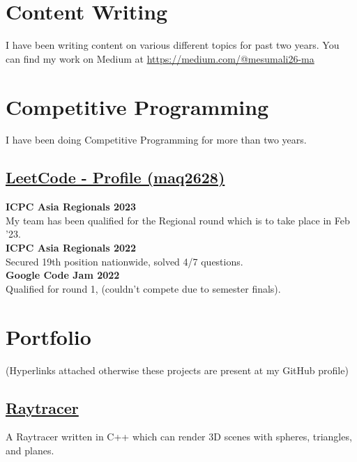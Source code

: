 \documentclass[]{resume}
\begin{document}
\begin{minipage}[t]{0.5\textwidth}


    \section{Content Writing}
    I have been writing content on various different topics for past two years. You can find my work on Medium at \href{https://medium.com/@mesumali26-ma}{https://medium.com/@mesumali26-ma}

    \section{Competitive Programming}
    I have been doing Competitive Programming for more than two years.\\
    \subsection{\href{https://leetcode.com/maq2628/}{\textbf{LeetCode - Profile (maq2628)}}}
    \textbf{ICPC Asia Regionals 2023}\\
    My team has been qualified for the Regional round which is to take place in Feb '23. \\
    \textbf{ICPC Asia Regionals 2022}\\
    Secured 19th position nationwide, solved 4/7 questions.\\
    \textbf{Google Code Jam 2022}\\
    Qualified for round 1, (couldn't compete due to semester finals).\\



    \section{Portfolio}
     (Hyperlinks attached otherwise these projects are present at my GitHub profile)\\

    \subsection{\href{https://github.com/Qazalbash/Raytracer}{\textbf{Raytracer}}}%
    A Raytracer written in C++ which can render 3D scenes with spheres, triangles, and planes.


\end{minipage}
\end{document}
